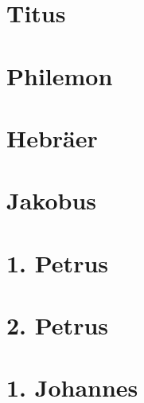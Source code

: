 \chapter{Titus}
\begin{multicols}{2}
  \raggedcolumns
  \parskip=0pt \relax
  
\end{multicols}

\chapter{Philemon}
\begin{multicols}{2}
  \raggedcolumns
  \parskip=0pt \relax
  
\end{multicols}

\chapter{Hebräer}
\begin{multicols}{2}
  \raggedcolumns
  \parskip=0pt \relax
  
\end{multicols}

\chapter{Jakobus}
\begin{multicols}{2}
  \raggedcolumns
  \parskip=0pt \relax
  
\end{multicols}

\chapter{1. Petrus}
\begin{multicols}{2}
  \raggedcolumns
  \parskip=0pt \relax
  
\end{multicols}

\chapter{2. Petrus}
\begin{multicols}{2}
  \raggedcolumns
  \parskip=0pt \relax
  
\end{multicols}

\chapter{1. Johannes}
\begin{multicols}{2}
  \raggedcolumns
  \parskip=0pt \relax
  
\end{multicols}

